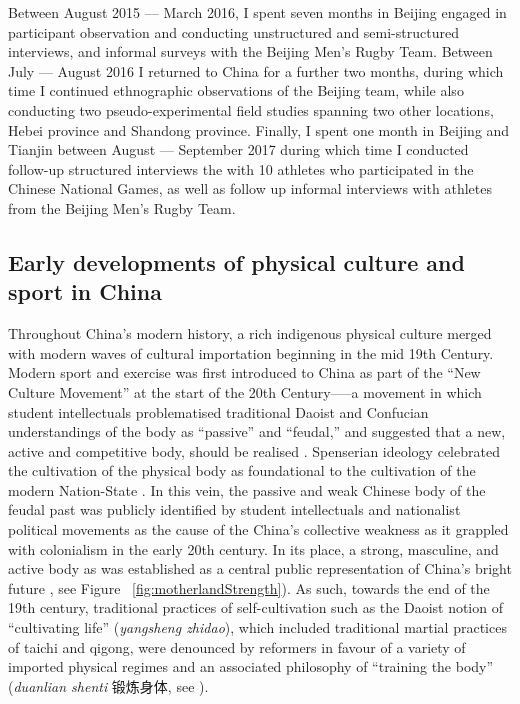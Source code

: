 Between August 2015 --- March 2016, I spent seven months in Beijing engaged in participant observation and conducting unstructured and semi-structured interviews, and informal surveys with the Beijing Men's Rugby Team. Between July --- August 2016 I returned to China for a further two months, during which time I continued ethnographic observations of the Beijing team, while also conducting two pseudo-experimental field studies spanning two other locations, Hebei province and Shandong province. Finally, I spent one month in Beijing and Tianjin between August --- September 2017 during which time I conducted follow-up structured interviews the with 10 athletes who participated in the Chinese National Games, as well as follow up informal interviews with athletes from the Beijing Men's Rugby Team.



\subsection{Early developments of physical culture and sport in China}
Throughout China's modern history, a rich indigenous physical culture merged with modern waves of cultural importation beginning in the mid 19th Century. Modern sport and exercise was first introduced to China as part of the ``New Culture Movement'' at the start of the 20th Century—--a movement in which student intellectuals problematised traditional Daoist and Confucian understandings of the body as ``passive'' and ``feudal,'' and suggested that a new, active and competitive body, should be realised \citep{Ge2005}.  Spenserian ideology celebrated the cultivation of the physical body as foundational to the cultivation of the modern Nation-State \citep{Morris2004}. In this vein, the passive and weak Chinese body of the feudal past was publicly identified by student intellectuals and nationalist political movements as the cause of the China's collective weakness as it grappled with colonialism in the early 20th century.
In its place, a strong, masculine, and active body as was established as a central public representation of China's bright future \citep{Brownell1995}, see Figure ~\ref{fig:motherlandStrength}).  As such, towards the end of the 19th century, traditional practices of self-cultivation such as the Daoist notion of ``cultivating life'' (\textit{yangsheng zhidao}), which included traditional martial practices of taichi and qigong, were denounced by reformers in favour of a variety of imported physical regimes and an associated philosophy of ``training the body'' (\textit{duanlian shenti} 锻炼身体, see \cite{Farquhar2012}).

